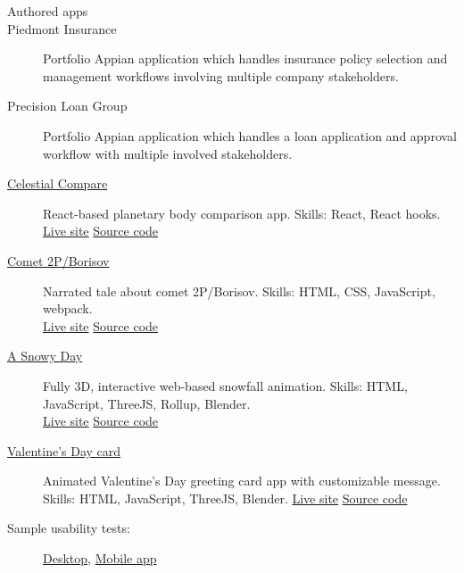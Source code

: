 \documentclass{article}
\begin{document}
\begin{description}
  \item[Authored apps]
  \item[Piedmont Insurance] Portfolio Appian application which handles insurance policy selection and management workflows involving multiple company stakeholders.
  \item[Precision Loan Group] Portfolio Appian application which handles a loan application and approval workflow with multiple involved stakeholders. 
  \item[\href{https://sirkoik.github.io/Celestial-Compare}{Celestial Compare}] React-based planetary body comparison app. Skills: React, React hooks.\\ \href{https://sirkoik.github.io/Celestial-Compare}{Live site} \textcolor{gray}{\textbullet} \href{https://github.com/sirkoik/Celestial-Compare}{Source code}
  \item[\href{https://sirkoik.github.io/BorisovXmas}{Comet 2P/Borisov}] Narrated tale about comet 2P/Borisov. Skills: HTML, CSS, JavaScript, webpack. \\ \href{https://sirkoik.github.io/BorisovXmas}{Live site} \textcolor{gray}{\textbullet} \href{https://github.com/sirkoik/BorisovXmas}{Source code}
  \item[\href{https://sirkoik.github.io/FallingObjects}{A Snowy Day}] Fully 3D, interactive web-based snowfall animation. Skills: HTML, JavaScript, ThreeJS, Rollup, Blender. \\
  \href{https://sirkoik.github.io/FallingObjects}{Live site} \textcolor{gray}{\textbullet} \href{https://github.com/sirkoik/FallingObjects}{Source code}
  \item[\href{https://sirkoik.github.io/February}{Valentine's Day card}] Animated Valentine's Day greeting card app with customizable message. \\
  Skills: HTML, JavaScript, ThreeJS, Blender. \href{https://sirkoik.github.io/February}{Live site} \textcolor{gray}{\textbullet} \href{https://github.com/sirkoik/February}{Source code}   
  \item[Sample usability tests:] \href{https://youtu.be/n0ts2tmBpzI}{Desktop}, \href{https://youtu.be/935ftL_X_rY}{Mobile app}
\end{description}

\end{document}
